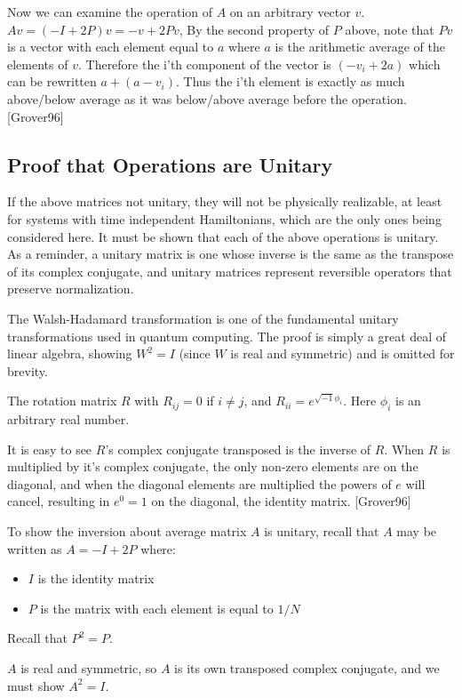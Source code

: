\documentclass[]{article}
\begin{document}
Now we can examine the operation of $A$ on an arbitrary vector $v$.
$Av = (-I + 2P)v = -v + 2Pv$, By the second property of $P$ above,
note that $Pv$ is a vector with each element equal to $a$ where $a$ is
the arithmetic average of the elements of $v$.  Therefore the i'th
component of the vector is $(-v_{i} + 2a)$ which can be rewritten
$a+(a-v_{i})$.  Thus the i'th element is exactly as much above/below
average as it was below/above average before the operation. [Grover96]

\subsection{Proof that Operations are Unitary}

If the above matrices not unitary, they will not be physically
realizable, at least for systems with time independent Hamiltonians,
which are the only ones being considered here.  It must be shown that
each of the above operations is unitary.  As a reminder, a unitary
matrix is one whose inverse is the same as the transpose of its
complex conjugate, and unitary matrices represent reversible operators
that preserve normalization.

The Walsh-Hadamard transformation is one of the fundamental unitary
transformations used in quantum computing.  The proof is simply a
great deal of linear algebra, showing $W^{2} = I$ (since $W$ is real
and symmetric) and is omitted for brevity.

The rotation matrix $R$ with $R_{ij} = 0$ if $ i \not = j$, and
$R_{ii} = e^{\sqrt{-1}\phi_{i}}$.  Here $\phi_{i}$ is an arbitrary
real number.

It is easy to see $R$'s complex conjugate transposed is the inverse of
$R$.  When $R$ is multiplied by it's complex conjugate, the only
non-zero elements are on the diagonal, and when the diagonal elements
are multiplied the powers of $e$ will cancel, resulting in $e^{0} = 1$
on the diagonal, the identity matrix. [Grover96]

To show the inversion about average matrix $A$ is unitary, recall that
$A$ may be written as $A = -I + 2P$ where:
\begin{itemize}
\item $I$ is the identity matrix
\item $P$ is the matrix with each element is equal to $1/N$
\end{itemize}

Recall that $P^{2} = P$.  

$A$ is real and symmetric, so $A$ is its own transposed complex
conjugate, and we must show $A^{2} = I$.  
\end{document}
